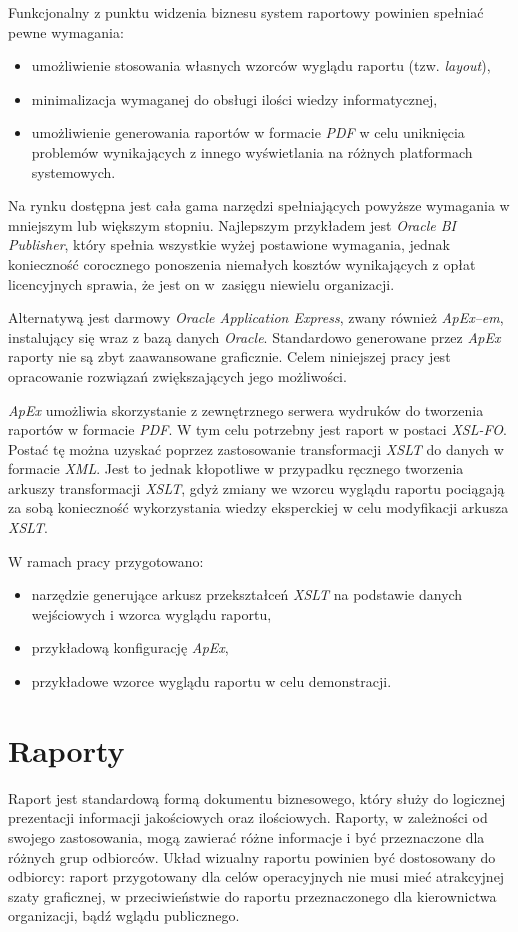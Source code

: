 \documentclass[11pt,a4paper]{article}
\begin{document}
Funkcjonalny z punktu widzenia biznesu system raportowy powinien spełniać pewne wymagania:
\begin{itemize}
	\item umożliwienie stosowania własnych wzorców wyglądu raportu (tzw. \emph{layout}),
	\item minimalizacja wymaganej do obsługi ilości wiedzy informatycznej,
	\item umożliwienie generowania raportów w formacie \emph{PDF} w celu uniknięcia problemów wynikających z innego wyświetlania na różnych platformach systemowych.
\end{itemize}

Na rynku dostępna jest cała gama narzędzi spełniających powyższe wymagania w mniejszym lub większym stopniu. Najlepszym przykładem jest \emph{Oracle BI Publisher}, który spełnia wszystkie wyżej postawione wymagania, jednak konieczność corocznego ponoszenia niemałych kosztów wynikających z opłat licencyjnych sprawia, że jest on w~zasięgu niewielu organizacji.

Alternatywą jest darmowy \emph{Oracle Application Express}, zwany również \emph{ApEx--em}, instalujący się wraz z bazą danych \emph{Oracle}. Standardowo generowane przez \emph{ApEx} raporty nie są zbyt zaawansowane graficznie. Celem niniejszej pracy jest opracowanie rozwiązań zwiększających jego możliwości.

\emph{ApEx} umożliwia skorzystanie z zewnętrznego serwera wydruków do tworzenia raportów w formacie \emph{PDF}. W tym celu potrzebny jest raport w postaci \emph{XSL-FO}. Postać tę można uzyskać poprzez zastosowanie transformacji \emph{XSLT} do danych w formacie \emph{XML}. Jest to jednak kłopotliwe w przypadku ręcznego tworzenia arkuszy transformacji \emph{XSLT}, gdyż zmiany we wzorcu wyglądu raportu pociągają za sobą konieczność wykorzystania wiedzy eksperckiej w celu modyfikacji arkusza \emph{XSLT}.

\bigskip
W ramach pracy przygotowano:
\begin{itemize}
	\item narzędzie generujące arkusz przekształceń \emph{XSLT} na podstawie danych wejściowych i wzorca wyglądu raportu,
	\item przykładową konfigurację \emph{ApEx},
	\item przykładowe wzorce wyglądu raportu w celu demonstracji.
\end{itemize}


\newpage

\section{Raporty} \label{sec:teoria}
Raport jest standardową formą dokumentu biznesowego, który służy do logicznej prezentacji informacji jakościowych oraz ilościowych.
 Raporty, w zależności od swojego zastosowania, mogą zawierać różne informacje i być przeznaczone dla różnych grup odbiorców. Układ wizualny raportu powinien być dostosowany do odbiorcy: raport przygotowany dla celów operacyjnych nie musi mieć atrakcyjnej szaty graficznej, w przeciwieństwie do raportu przeznaczonego dla kierownictwa organizacji, bądź wglądu publicznego. 
\end{document}
